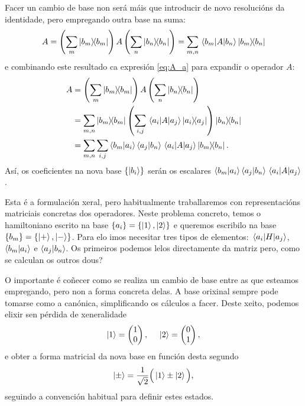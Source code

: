 \documentclass[a4paper,12pt]{article}
\begin{document}
Facer un cambio de base non será máis que introducir de novo resolucións da identidade, pero empregando outra base na suma:
\begin{equation}
	A = \left( \sum_m \ketbra{b_m} \right) A \left( \sum_n \ketbra{b_n} \right) = \sum_{m,n} \mel{b_m}{A}{b_n} \ketbra{b_m}{b_n}
\end{equation}
\noindent 
e combinando este resultado ca expresión \eqref{eq:A_a} para expandir o operador $A$:
\begin{equation}
\begin{split}
	A &= \left( \sum_m \ketbra{b_m} \right) A \left( \sum_n \ketbra{b_n} \right) \\
	&=	\sum_{m,n} \ketbra{b_m} \left( \sum_{i,j} \mel{a_i}{A}{a_j} \ketbra{a_i}{a_j} \right) \ketbra{b_n} \\
	&= \sum_{m,n} \sum_{i,j} \braket{b_m}{a_i} \braket{a_j}{b_n} \mel{a_i}{A}{a_j} \ketbra{b_m}{b_n}. 
\end{split}
\end{equation}
\noindent
Así, os coeficientes na nova base $\{\ket{b_i}\}$ serán os escalares $\braket{b_m}{a_i} \braket{a_j}{b_n} \mel{a_i}{A}{a_j}$.

Esta é a formulación xeral, pero habitualmente traballaremos con representacións matriciais concretas dos operadores. Neste problema concreto, temos o hamiltoniano escrito na base $\{a_i\} = \{\ket{1},\ket{2}\}$ e queremos escribilo na base $\{b_m\} = \{\ket{+},\ket{-}\}$. Para elo imos necesitar tres tipos de elementos: $\mel{a_i}{H}{a_j}$, $\braket{b_m}{a_i}$ e $\braket{a_j}{b_n}$. Os primeiros podemos lelos directamente da matriz pero, como se calculan os outros dous?

O importante é coñecer como se realiza un cambio de base entre as que esteamos empregando, pero non a forma concreta delas. A base orixinal sempre pode tomarse como a canónica, simplificando os cálculos a facer. Deste xeito, podemos elixir sen pérdida de xeneralidade
\begin{equation}
	\ket{1} = \begin{pmatrix} 1 \\ 0 \end{pmatrix}, ~~~~ \ket{2} = \begin{pmatrix} 0 \\ 1 \end{pmatrix},
\end{equation}
\noindent
e obter a forma matricial da nova base en función desta segundo
\begin{equation}
	\ket{\pm} = \frac{1}{\sqrt{2}} \Big ( \ket{1} \pm \ket{2} \Big ),
\end{equation}
\noindent
seguindo a convención habitual para definir estes estados.
\end{document}
